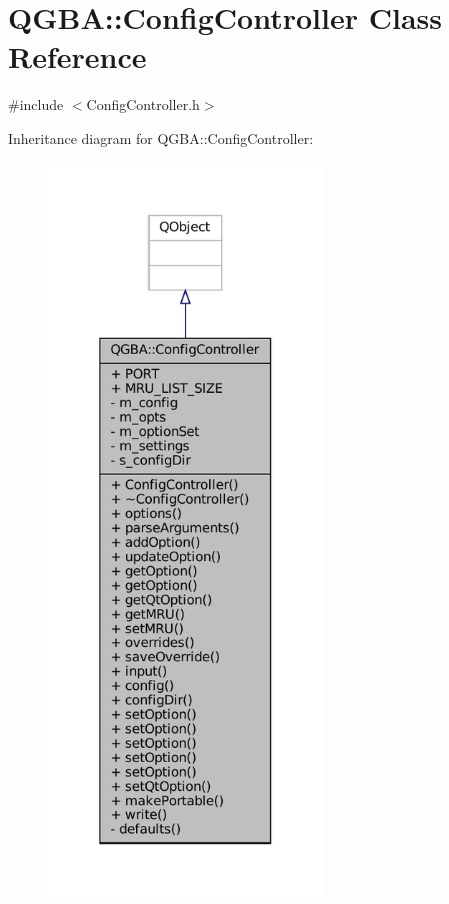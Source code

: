 \hypertarget{class_q_g_b_a_1_1_config_controller}{}\section{Q\+G\+BA\+:\+:Config\+Controller Class Reference}
\label{class_q_g_b_a_1_1_config_controller}


{\ttfamily \#include $<$Config\+Controller.\+h$>$}



Inheritance diagram for Q\+G\+BA\+:\+:Config\+Controller\+:
\nopagebreak
\begin{figure}[H]
\begin{center}
\leavevmode
\includegraphics[height=550pt]{class_q_g_b_a_1_1_config_controller__inherit__graph}
\end{center}
\end{figure}


